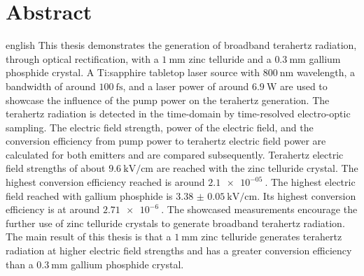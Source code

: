 \thispagestyle{plain}

\section*{Abstract}
\begin{foreignlanguage}{english}
This thesis demonstrates the generation of broadband terahertz radiation, through optical rectification, with a $\SI{1}{\milli\meter}$ zinc telluride and a $\SI{0.3}{\milli\meter}$ gallium phosphide crystal.
A Ti:sapphire tabletop laser source with $\SI{800}{\nano\meter}$ wavelength, a bandwidth of around $\SI{100}{\femto\second}$, and a laser power of around $\SI{6.9}{\W}$ are used to showcase the influence of the pump power on the terahertz generation.
The terahertz radiation is detected in the time-domain by time-resolved electro-optic sampling.
The electric field strength, power of the electric field, and the conversion efficiency from pump power to terahertz electric field power are calculated for both emitters and are compared subsequently.
Terahertz electric field strengths of about $\SI{9.6}{\kilo\V\per\centi\meter}$ are reached with the zinc telluride crystal.
The highest conversion efficiency reached is around $\SI{2.1e-05}{}$.
The highest electric field reached with gallium phosphide is $\SI{3.38(5)}{\kilo\V\per\centi\meter}$.
Its highest conversion efficiency is at around $\SI{2.71e-6}{}$.
The showcased measurements encourage the further use of zinc telluride crystals to generate broadband terahertz radiation.
The main result of this thesis is that a $\SI{1}{\milli\meter}$ zinc telluride generates terahertz radiation at higher electric field strengths and has a greater conversion efficiency than a $\SI{0.3}{\milli\meter}$ gallium phosphide crystal. 
\end{foreignlanguage}
